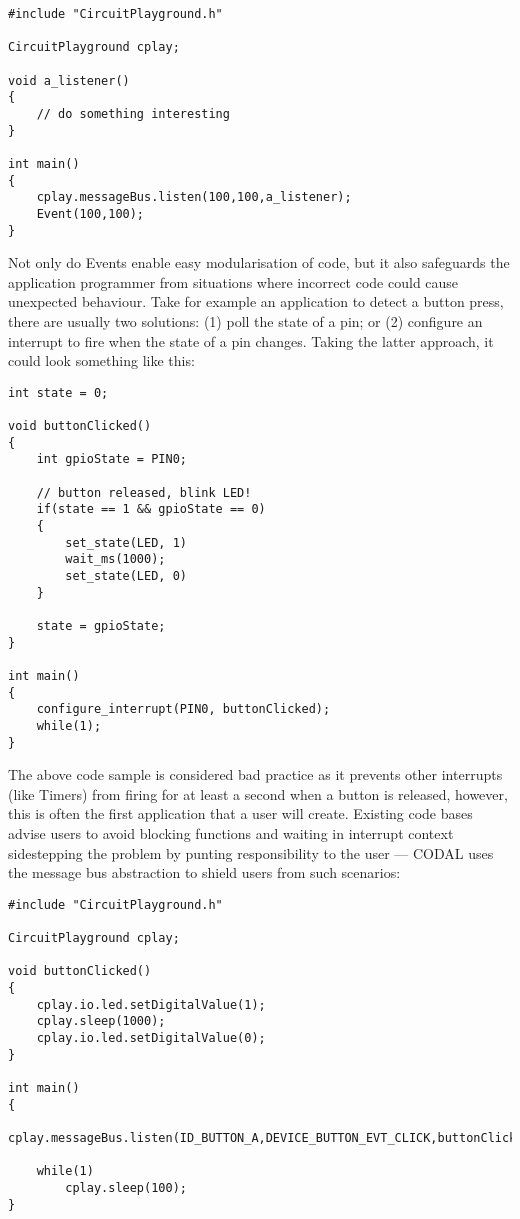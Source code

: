 \begin{lstlisting}
#include "CircuitPlayground.h"

CircuitPlayground cplay;

void a_listener()
{
    // do something interesting
}

int main()
{
    cplay.messageBus.listen(100,100,a_listener);
    Event(100,100);
}
\end{lstlisting}

Not only do Events enable easy modularisation of code, but it also safeguards the application programmer from situations where incorrect code could cause unexpected behaviour. Take for example an application to detect a button press, there are usually two solutions: (1) poll the state of a pin; or (2) configure an interrupt to fire when the state of a pin changes. Taking the latter approach, it could look something like this:

\begin{lstlisting}
int state = 0;

void buttonClicked()
{
    int gpioState = PIN0;

    // button released, blink LED!
    if(state == 1 && gpioState == 0)
    {
        set_state(LED, 1)
        wait_ms(1000);
        set_state(LED, 0)
    }

    state = gpioState;
}

int main()
{
    configure_interrupt(PIN0, buttonClicked);
    while(1);
}
\end{lstlisting}

The above code sample is considered bad practice as it prevents other interrupts (like Timers) from firing for at least a second when a button is released, however, this is often the first application that a user will create. Existing code bases advise users to avoid blocking functions and waiting in interrupt context sidestepping the problem by punting responsibility to the user --- CODAL uses the message bus abstraction to shield users from such scenarios:

\begin{lstlisting}
#include "CircuitPlayground.h"

CircuitPlayground cplay;

void buttonClicked()
{
    cplay.io.led.setDigitalValue(1);
    cplay.sleep(1000);
    cplay.io.led.setDigitalValue(0);
}

int main()
{
    cplay.messageBus.listen(ID_BUTTON_A,DEVICE_BUTTON_EVT_CLICK,buttonClicked);

    while(1)
        cplay.sleep(100);
}
\end{lstlisting}

